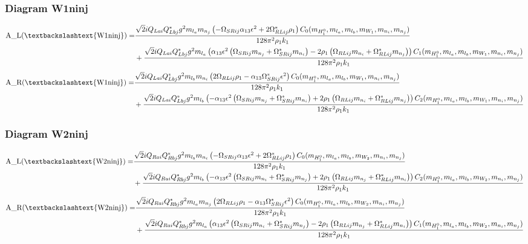 \documentclass{article}
\begin{document}
\subsubsection{Diagram W1ninj}
\begin{align*}
\mathtt{\text{A\_L(\textbackslashtext\{W1ninj\})}} = & \frac{\sqrt{2} i Q_{Lai} Q_{Lbj}^* g^{2} m_{l_a} m_{n_j} \left(- \Omega_{SRij} \alpha_{13} \epsilon^{2} + 2 \Omega_{RLij}^* \rho_{1}\right) C_0(m_{H_1^0}, m_{l_a}, m_{l_b}, m_{W_1}, m_{n_i}, m_{n_j})}{128 \pi^{2} \rho_{1} k_{1}} \\
& + \frac{\sqrt{2} i Q_{Lai} Q_{Lbj}^* g^{2} m_{l_a} \left(\alpha_{13} \epsilon^{2} \left(\Omega_{SRij} m_{n_j} + \Omega_{SRij}^* m_{n_i}\right) - 2 \rho_{1} \left(\Omega_{RLij} m_{n_i} + \Omega_{RLij}^* m_{n_j}\right)\right) C_1(m_{H_1^0}, m_{l_a}, m_{l_b}, m_{W_1}, m_{n_i}, m_{n_j})}{128 \pi^{2} \rho_{1} k_{1}} 
\end{align*}
\begin{align*}
\mathtt{\text{A\_R(\textbackslashtext\{W1ninj\})}} = & \frac{\sqrt{2} i Q_{Lai} Q_{Lbj}^* g^{2} m_{l_b} m_{n_i} \left(2 \Omega_{RLij} \rho_{1} - \alpha_{13} \Omega_{SRij}^* \epsilon^{2}\right) C_0(m_{H_1^0}, m_{l_a}, m_{l_b}, m_{W_1}, m_{n_i}, m_{n_j})}{128 \pi^{2} \rho_{1} k_{1}} \\
& + \frac{\sqrt{2} i Q_{Lai} Q_{Lbj}^* g^{2} m_{l_b} \left(- \alpha_{13} \epsilon^{2} \left(\Omega_{SRij} m_{n_j} + \Omega_{SRij}^* m_{n_i}\right) + 2 \rho_{1} \left(\Omega_{RLij} m_{n_i} + \Omega_{RLij}^* m_{n_j}\right)\right) C_2(m_{H_1^0}, m_{l_a}, m_{l_b}, m_{W_1}, m_{n_i}, m_{n_j})}{128 \pi^{2} \rho_{1} k_{1}} 
\end{align*}
\subsubsection{Diagram W2ninj}
\begin{align*}
\mathtt{\text{A\_L(\textbackslashtext\{W2ninj\})}} = & \frac{\sqrt{2} i Q_{Rai} Q_{Rbj}^* g^{2} m_{l_b} m_{n_i} \left(- \Omega_{SRij} \alpha_{13} \epsilon^{2} + 2 \Omega_{RLij}^* \rho_{1}\right) C_0(m_{H_1^0}, m_{l_a}, m_{l_b}, m_{W_2}, m_{n_i}, m_{n_j})}{128 \pi^{2} \rho_{1} k_{1}} \\
& + \frac{\sqrt{2} i Q_{Rai} Q_{Rbj}^* g^{2} m_{l_b} \left(- \alpha_{13} \epsilon^{2} \left(\Omega_{SRij} m_{n_i} + \Omega_{SRij}^* m_{n_j}\right) + 2 \rho_{1} \left(\Omega_{RLij} m_{n_j} + \Omega_{RLij}^* m_{n_i}\right)\right) C_2(m_{H_1^0}, m_{l_a}, m_{l_b}, m_{W_2}, m_{n_i}, m_{n_j})}{128 \pi^{2} \rho_{1} k_{1}} 
\end{align*}
\begin{align*}
\mathtt{\text{A\_R(\textbackslashtext\{W2ninj\})}} = & \frac{\sqrt{2} i Q_{Rai} Q_{Rbj}^* g^{2} m_{l_a} m_{n_j} \left(2 \Omega_{RLij} \rho_{1} - \alpha_{13} \Omega_{SRij}^* \epsilon^{2}\right) C_0(m_{H_1^0}, m_{l_a}, m_{l_b}, m_{W_2}, m_{n_i}, m_{n_j})}{128 \pi^{2} \rho_{1} k_{1}} \\
& + \frac{\sqrt{2} i Q_{Rai} Q_{Rbj}^* g^{2} m_{l_a} \left(\alpha_{13} \epsilon^{2} \left(\Omega_{SRij} m_{n_i} + \Omega_{SRij}^* m_{n_j}\right) - 2 \rho_{1} \left(\Omega_{RLij} m_{n_j} + \Omega_{RLij}^* m_{n_i}\right)\right) C_1(m_{H_1^0}, m_{l_a}, m_{l_b}, m_{W_2}, m_{n_i}, m_{n_j})}{128 \pi^{2} \rho_{1} k_{1}} 
\end{align*}
\end{document}
